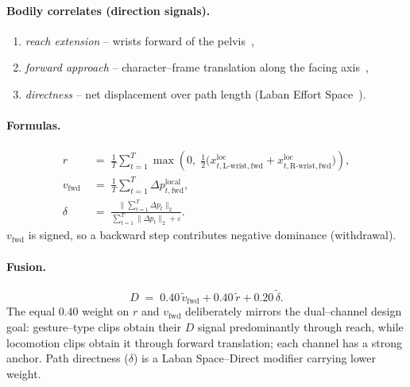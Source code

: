 \paragraph{Bodily correlates (direction signals).}
\begin{enumerate}\itemsep1pt
  \item \emph{reach extension} -- wrists forward of the
        pelvis~\cite{ekman1972hand},
  \item \emph{forward approach} -- character--frame translation along the
        facing axis~\cite{hall1966hidden},
  \item \emph{directness} -- net displacement over path length
        (Laban Effort\,\textperiodcentered\,Space~\cite{laban1947effort}).
\end{enumerate}

\paragraph{Formulas.}
\begin{align}
  r              &\;=\; \frac{1}{T}\sum_{t=1}^{T}\max\!\left(0,\;\tfrac{1}{2}\bigl(x^{\text{loc}}_{t,\text{L-wrist},\text{fwd}}+x^{\text{loc}}_{t,\text{R-wrist},\text{fwd}}\bigr)\right),
                    \label{eq:D-reach}\\[2pt]
  v_{\text{fwd}} &\;=\; \frac{1}{T}\sum_{t=1}^{T}\Delta p^{\text{local}}_{t,\text{fwd}},
                    \label{eq:D-vfwd}\\[2pt]
  \delta         &\;=\; \frac{\bigl\|\sum_{t=1}^{T}\Delta p_t\bigr\|_2}{\sum_{t=1}^{T}\bigl\|\Delta p_t\bigr\|_2+\varepsilon}.
                    \label{eq:D-delta}
\end{align}
$v_{\text{fwd}}$ is signed, so a backward step contributes negative
dominance (withdrawal).

\paragraph{Fusion.}
\begin{equation}
  D \;=\; 0.40\,\tilde v_{\text{fwd}} + 0.40\,\tilde r + 0.20\,\tilde\delta.
  \label{eq:D-fuse}
\end{equation}
The equal $0.40$ weight on $r$ and $v_{\text{fwd}}$ deliberately mirrors
the dual--channel design goal: gesture--type clips obtain their $D$
signal predominantly through reach, while locomotion clips obtain it
through forward translation; each channel has a strong anchor. Path
directness ($\delta$) is a Laban Space--Direct modifier carrying lower
weight.

